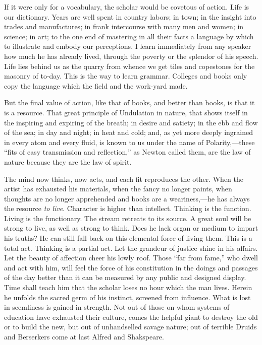 If it were only for a vocabulary, the scholar  would be
covetous of action. Life is our dictionary. Years are well spent in
country labors; in town; in the insight into trades and manufactures;
in frank intercourse with many men and women; in science; in art; to
the one end of mastering in all their facts a language by which to
illustrate and embody our perceptions. I learn immediately from any
speaker how much he has already lived, through the poverty or the
splendor of his speech. Life lies behind us as the quarry from whence
we get tiles and copestones for the masonry of to-day. This is the way
to learn grammar. Colleges and books only copy the language which the
field and the work-yard made.

But the final value of action, like that of books, and better than
books, is that it is a resource. That great principle of Undulation in
nature, that shows itself in the inspiring and expiring of the breath;
in desire and satiety; in the ebb and flow of the sea; in day and
night; in heat and cold; and, as yet more deeply ingrained in every
atom and every fluid, is known to us under the name of
Po\-lar\-i\-ty,---these ``fits of easy transmission and reflection,''
as Newton called them, are the law of nature because they are the law
of spirit.

The mind now thinks, now acts, and each fit reproduces the
other. When the artist has exhausted his materials, when the fancy no
longer paints, when thoughts are no longer apprehended and books are a
wear\-i\-ness,---he has always the resource \textit{to live}.
Character is higher than intellect. Thinking is the function. Living
is the functionary. The stream retreats to its source. A great soul
will be strong to live, as well as strong to think. Does he lack organ
or medium to impart his truths? He can still fall back on this
elemental force of living them. This is a total act. Thinking is a
partial act. Let the grandeur of justice shine in his affairs. Let the
beauty of affection cheer his lowly roof. Those ``far from fame,'' who
dwell and act with him, will feel the force of his constitution in the
doings and passages of the day better than it can be measured by any
public and designed display. Time shall teach him that the scholar
loses no hour which the man lives. Herein he unfolds the sacred germ
of his instinct, screened from influence. What is lost in seemliness
is gained in strength. Not out of those on whom systems of education
have exhausted their culture, comes the helpful giant to destroy the
old or to build the new, but out of unhandselled  savage
nature; out of terrible Druids and Berserkers come at last Alfred and
Shakspeare.


